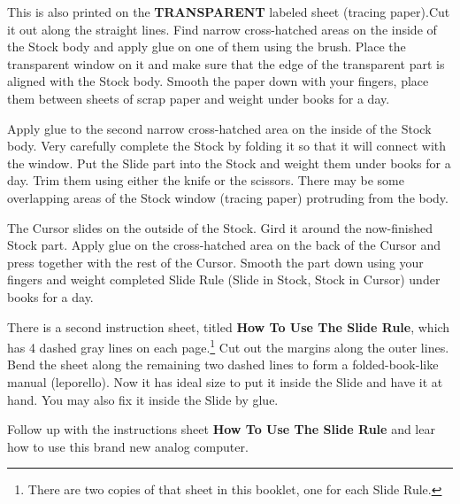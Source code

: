 \begin{multicols*}{3}
{  

This is also printed on the \textbf{TRANSPARENT} labeled sheet (tracing paper).\footnotemark[\value{footnote}] Cut it out along the straight lines. Find narrow cross-hatched areas on the inside of the Stock body and apply glue on one of them using the brush. Place the transparent window on it and make sure that the edge of the transparent part is aligned with the Stock body. Smooth the paper down with your fingers, place them between sheets of scrap paper and weight under books for a day.


Apply glue to the second narrow cross-hatched area on the inside of the Stock body. Very carefully complete the Stock by folding it so that it will connect with the window. Put the Slide part into the Stock and weight them under books for a day.
Trim them using either the knife or the scissors.
There may be some overlapping areas of the Stock window (tracing paper) protruding from the body. 


The Cursor slides on the outside of the Stock. Gird it around the now-finished Stock part. Apply glue on the cross-hatched area on the back of the Cursor and press together with the rest of the Cursor. Smooth the part down using your fingers and weight completed Slide Rule (Slide in Stock, Stock in Cursor) under books for a day.


There is a second instruction sheet, titled \textbf{How To Use The Slide Rule}, which has 4 dashed gray lines 
on each page.\footnote{There are two copies of that sheet in this booklet, one for each Slide Rule.} Cut out the margins along the outer lines. Bend the sheet along the remaining two dashed lines to form a folded-book-like manual (leporello). Now it has ideal size to put it inside the Slide and have it at hand. You may also fix it inside the Slide by glue.


Follow up with the instructions sheet \textbf{How To Use The Slide Rule} and lear how to use this brand new analog computer.

  }
  \end{multicols*}
  

